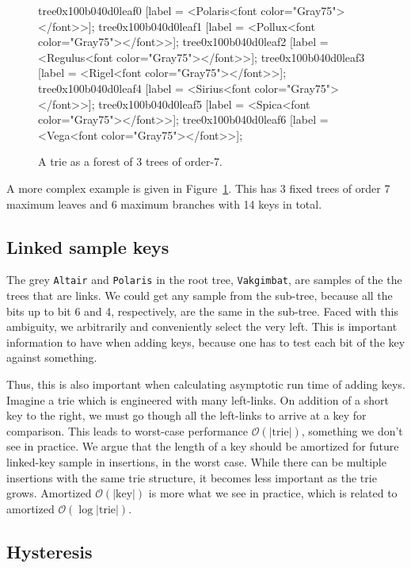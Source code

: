\documentclass[12pt]{article}
\newcommand{\code}[1]{\colorbox{light-gray}{\texttt{#1}}}
\begin{document}
\begin{figure}
{{	tree0x100b040d0leaf0 [label = <Polaris<font color="Gray75"></font>>];
	tree0x100b040d0leaf1 [label = <Pollux<font color="Gray75"></font>>];
	tree0x100b040d0leaf2 [label = <Regulus<font color="Gray75"></font>>];
	tree0x100b040d0leaf3 [label = <Rigel<font color="Gray75"></font>>];
	tree0x100b040d0leaf4 [label = <Sirius<font color="Gray75"></font>>];
	tree0x100b040d0leaf5 [label = <Spica<font color="Gray75"></font>>];
	tree0x100b040d0leaf6 [label = <Vega<font color="Gray75"></font>>];
}
	}
	\caption{A trie as a forest of 3 trees of order-7.\label{star-1}}
\end{figure}

A more complex example is given in Figure~\ref{star-1}. This has 3 fixed trees of order 7 maximum leaves and 6 maximum branches with 14 keys in total.

\subsection{Linked sample keys}

The grey \code{Altair} and \code{Polaris} in the root tree, \code{Vakgimbat}, are samples of the the trees that are links. We could get any sample from the sub-tree, because all the bits up to bit 6 and 4, respectively, are the same in the sub-tree. Faced with this ambiguity, we arbitrarily and conveniently select the very left. This is important information to have when adding keys, because one has to test each bit of the key against something.

Thus, this is also important when calculating asymptotic run time of adding keys. Imagine a trie which is engineered with many left-links. On addition of a short key to the right, we must go though all the left-links to arrive at a key for comparison. This leads to worst-case performance $\mathcal{O}(|\text{trie}|)$, something we don't see in practice. We argue that the length of a key should be amortized for future linked-key sample in insertions, in the worst case. While there can be multiple insertions with the same trie structure, it becomes less important as the trie grows. Amortized $\mathcal{O}(|\text{key}|)$ is more what we see in practice, which is related to amortized $\mathcal{O}(\log |\text{trie}|)$\cite{shannon1948mathematical}.

\subsection{Hysteresis}
\end{document}
